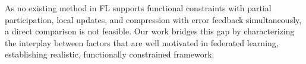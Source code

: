 \documentclass{article} %
\begin{document}
As no existing method in FL supports functional constraints with partial participation, local updates, and compression with error feedback simultaneously, a direct comparison is not feasible. Our work bridges this gap by characterizing the interplay between factors that are well motivated in federated learning, establishing realistic, functionally constrained framework.
\end{document}
